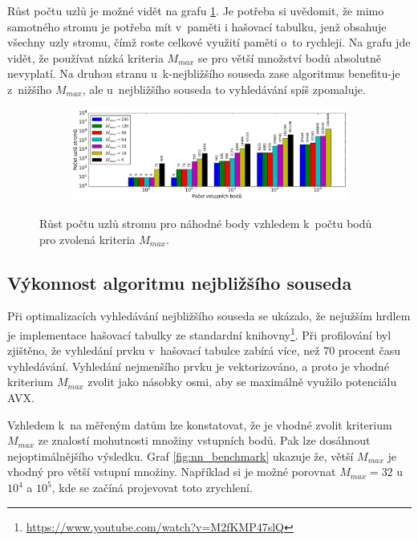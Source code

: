 Růst počtu uzlů je možné vidět na grafu \ref{fig:benchmark_nodes_points_Mmax}. Je potřeba si uvědomit, že mimo samotného stromu je potřeba mít v~paměti i hašovací tabulku, jenž obsahuje všechny uzly stromu, čímž roste celkové využití paměti o~to rychleji. Na grafu jde vidět, že používat nízká kriteria $M_{max}$ se pro větší množství bodů absolutně nevyplatí. Na druhou stranu u~k-nejbližšího souseda zase algoritmus benefitu-je z~nižšího $M_{max}$, ale u~nejbližšího souseda to vyhledávání spíš zpomaluje.

\begin{figure}

    \begin{subfigure}[t]{1\columnwidth}
        \centering
        \includegraphics[scale=0.4]{obrazky-figures/benchmark/benchmark_median_points_memory.pdf}


    \end{subfigure}
    \caption{Růst počtu uzlů stromu pro náhodné body vzhledem k~počtu bodů pro zvolená kriteria $M_{max}$. }
    \label{fig:benchmark_nodes_points_Mmax}

\end{figure}

\subsection*{Výkonnost algoritmu nejbližšího souseda}
Při optimalizacích vyhledávání nejbližšího souseda se ukázalo, že nejužším hrdlem je implementace hašovací tabulky ze standardní knihovny\footnote{\url{https://www.youtube.com/watch?v=M2fKMP47slQ}}. Při profilování byl zjištěno, že vyhledání prvku v~hašovací tabulce zabírá více, než 70 procent času vyhledávání. Vyhledání nejmenšího prvku je vektorizováno, a proto je vhodné kriterium $M_{max}$ zvolit jako násobky osmi, aby se maximálně využilo potenciálu AVX. 

Vzhledem k~na měřeným datům lze konstatovat, že je vhodné zvolit kriterium $M_{max}$ ze znalostí mohutnosti množiny vstupních bodů. Pak lze dosáhnout nejoptimálnějšího výsledku. Graf \ref{fig:nn_benchmark} ukazuje že, větší $M_{max}$ je vhodný pro větší vstupní množiny. Například si je možné porovnat $M_{max}=32$ u~$10^4$ a $10^5$, kde se začíná projevovat toto zrychlení.  

